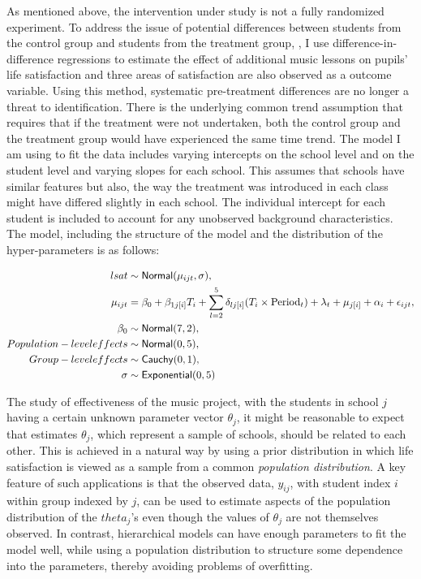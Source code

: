 \documentclass[a4, 12pt]{article}
\begin{document}
\label{sec:model}
As mentioned above, the intervention under study is not a fully randomized experiment. To address the issue of potential differences between students from the control group and students from the treatment group, , I use difference-in-difference regressions to estimate the effect of additional music lessons on pupils' life satisfaction and three areas of satisfaction are also observed as a outcome variable. Using this method, systematic pre-treatment differences are no longer a threat to identification. There is the underlying common trend assumption that requires that if the treatment were not undertaken, both the control group and the treatment group would have experienced the same time trend.
The model I am using to fit the data includes varying intercepts on the school level and on the student level and varying slopes for each school. This assumes that schools have similar features but also, the way the treatment was introduced in each class might have differed slightly in each school. The individual intercept for each student is included to account for any unobserved background characteristics. The model, including the structure of the model and the distribution of the hyper-parameters is as follows:

\begin{align*}
lsat & \sim {\sf Normal} (\mu_{ijt}, \sigma), \\
\mu_{ijt} & = \beta_0 + \beta_{1j[i]} T_i + \sum\limits_{l=2}^5\delta_{lj[i]} (T_{i} \times \text{Period}_{t}) + \lambda_t + \mu_{j[i]} + \alpha_{i} + \epsilon_{ijt}, \\
\beta_0 & \sim  {\sf Normal}(7,2), \\
Population-level effects & \sim {\sf Normal}(0,5), \\
Group-level effects & \sim {\sf Cauchy}(0,1), \\
\sigma & \sim {\sf Exponential}(0,5)
\end{align*}

The study of effectiveness of the music project, with the students in school \(j\) having a certain unknown parameter vector \(\theta_j\), it might be reasonable to expect that estimates \(\theta_j\), which represent a sample of schools, should be related to each other. This is achieved in a natural way by using a prior distribution in which life satisfaction is viewed as a sample from a common \emph{population distribution}. A key feature of such applications is that the observed data, \(y_{ij}\), with student index \(i\) within group indexed by \(j\), can be used to estimate aspects of the population distribution of the \(theta_j\)'s even though the values of \(\theta_j\) are not themselves observed. In contrast, hierarchical models can have enough parameters to fit the model well, while using a population distribution to structure some dependence into the parameters, thereby avoiding problems of overfitting.
\end{document}
